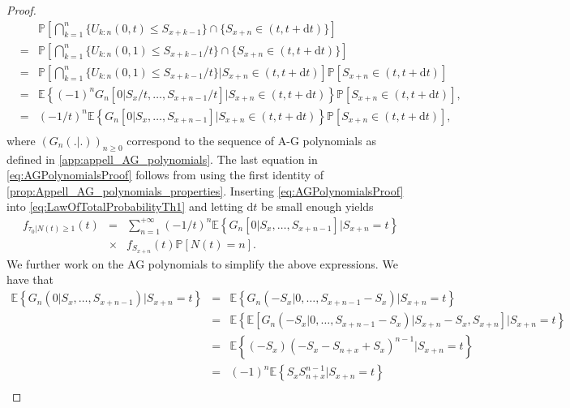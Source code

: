 \begin{proof}
\begin{eqnarray}
&&\mathbb{P}\left[\bigcap_{k=1}^{n}\{U_{k:n}(0,t)\leq S_{x+k-1}\}\cap\{S_{x+n}\in(t,t+\text{d}t)\}\right]\nonumber\\
&=&\mathbb{P}\left[\bigcap_{k=1}^{n}\{U_{k:n}(0,1)\leq S_{x+k-1}/ t\}\cap\{S_{x+n}\in(t,t+\text{d}t)\}\right]\nonumber\\
&=&\mathbb{P}\left[\bigcap_{k=1}^{n}\{U_{k:n}(0,1)\leq S_{x+k-1}/t\}\big\rvert S_{x+n}\in(t,t+\text{d}t)\right]\mathbb{P}[S_{x+n}\in(t,t+\text{d}t)]\nonumber\\
&=&\mathbb{E}\left\{(-1)^{n}G_{n}[0\big\rvert S_{x}/t,\ldots, S_{x+n-1} / t] \big\rvert S_{x+n}\in(t,t+\text{d}t)\right\}\mathbb{P}[S_{x+n}\in(t,t+\text{d}t)],\nonumber\\
&=&(-1/t)^{n}\mathbb{E}\left\{G_{n}[0\big\rvert S_{x},\ldots, S_{x+n-1}] \big\rvert S_{x+n}\in(t,t+\text{d}t)\right\}\mathbb{P}[S_{x+n}\in(t,t+\text{d}t)],\nonumber\\
&&\label{eq:AGPolynomialsProof}
\end{eqnarray}
where $(G_n(.|.))_{n\geq 0}$ correspond to the sequence of A-G polynomials as defined in \cref{app:appell_AG_polynomials}. The last equation in \eqref{eq:AGPolynomialsProof} follows from using the first identity of \cref{prop:Appell_AG_polynomials_properties}.
Inserting \eqref{eq:AGPolynomialsProof} into \eqref{eq:LawOfTotalProbabilityTh1} and letting $\text{d}t$ be small enough yields
\begin{eqnarray}
f_{\tau_0|N(t)\geq1}(t)&=&\sum_{n=1}^{+\infty}(-1/t)^{n}\mathbb{E}\left\{G_{n}[0\big\rvert S_{x},\ldots,S_{x+n-1}] \big\rvert S_{x+n}=t\right\}\nonumber\\
&\times&f_{S_{x+n}}(t)\mathbb{P}[N(t)=n]\label{eq:cond_pdf_tau_N_greater_than_1}.
\end{eqnarray}
We further work on the AG polynomials to simplify the above expressions. We have that
\begin{eqnarray} 
\mathbb{E}\left\{G_{n}(0\big\rvert S_{x},\ldots,S_{x+n-1}) \rvert S_{x+n}=t\right\}&=& \mathbb{E}\left\{G_{n}(-S_x\rvert 0,\ldots,S_{x+n-1}-S_x) \rvert S_{x+n}=t\right\} \nonumber\\
&=& \mathbb{E}\left\{\mathbb{E}\left[G_{n}(-S_x\rvert 0,\ldots,S_{x+n-1}-S_x)\rvert S_{x+n}-S_x, S_{x+n}\right] \rvert S_{x+n}=t\right\} \nonumber\\
&=& \mathbb{E}\left\{(-S_x)(-S_x-S_{n+x}+S_x)^{n-1} \rvert S_{x+n}=t\right\} \nonumber\\
&=& (-1)^n\mathbb{E}\left\{S_x S_{n+x}^{n-1} \rvert S_{x+n}=t\right\} \nonumber\\

\end{eqnarray}
\end{proof}
